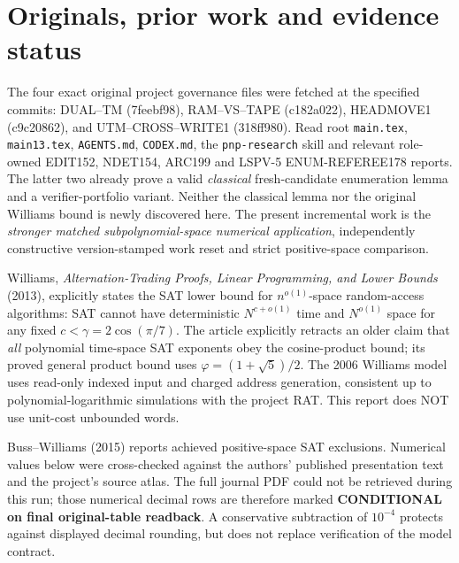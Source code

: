 \documentclass[11pt]{article}
\begin{document}
\section{Originals, prior work and evidence status}
The four exact original project governance files were fetched at the
specified commits: DUAL--TM (7feebf98), RAM--VS--TAPE (c182a022),
HEADMOVE1 (c9c20862), and UTM--CROSS--WRITE1 (318ff980).
Read root \texttt{main.tex}, \texttt{main13.tex}, \texttt{AGENTS.md},
\texttt{CODEX.md}, the \texttt{pnp-research} skill and relevant role-owned
EDIT152, NDET154, ARC199 and LSPV-5 ENUM-REFEREE178 reports.
The latter two already prove a valid \emph{classical} fresh-candidate
enumeration lemma and a verifier-portfolio variant. Neither the classical
lemma nor the original Williams bound is newly discovered here.
The present incremental work is the \emph{stronger matched
subpolynomial-space numerical application}, independently constructive
version-stamped work reset and strict positive-space comparison.

Williams, \emph{Alternation-Trading Proofs, Linear Programming, and
Lower Bounds} (2013), explicitly states the SAT lower bound for
$n^{o(1)}$-space random-access algorithms:
SAT cannot have deterministic $N^{c+o(1)}$ time and $N^{o(1)}$
space for any fixed $c<\gamma=2\cos(\pi/7)$.
The article explicitly retracts an older claim that \emph{all}
polynomial time-space SAT exponents obey the cosine-product bound;
its proved general product bound uses $\varphi=(1+\sqrt5)/2$.
The 2006 Williams model uses read-only indexed input and charged
address generation, consistent up to polynomial-logarithmic simulations
with the project RAT. This report does NOT use unit-cost unbounded words.

Buss--Williams (2015) reports achieved positive-space SAT exclusions.
Numerical values below were cross-checked against the authors' published
presentation text and the project's source atlas. The full journal PDF
could not be retrieved during this run; those numerical decimal rows are
therefore marked \textbf{CONDITIONAL on final original-table readback}.
A conservative subtraction of $10^{-4}$ protects against displayed
decimal rounding, but does not replace verification of the model contract.
\end{document}
